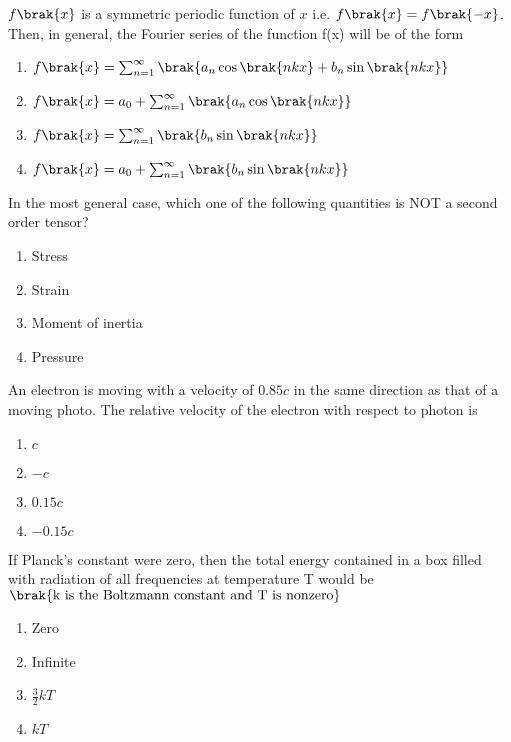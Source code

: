 \iffalse
\chapter{2013}
\author{EE24BTECH11003}
\section{ph}
\fi
\item $f\brak{x}$ is a symmetric periodic function of $x$ i.e. $f\brak{x} = f\brak{-x}$. Then, in general, the Fourier series of the function f(x) will be of the form
\hfill{}
\begin{enumerate}
\item $f\brak{x} = \sum_{n=1}^{\infty} \brak{a_n \cos\brak{nkx} + b_n\sin\brak{nkx}}$
\item $f\brak{x} = a_0 + \sum_{n=1}^{\infty} \brak{a_n \cos\brak{nkx}}$
\item $f\brak{x} = \sum_{n=1}^{\infty} \brak{b_n\sin\brak{nkx}}$
\item $f\brak{x} = a_0 + \sum_{n=1}^{\infty} \brak{b_n\sin\brak{nkx}}$
\end{enumerate}

\item In the most general case, which one of the following quantities is NOT a second order tensor?
\hfill{}
\begin{enumerate}
\item Stress
\item Strain
\item Moment of inertia
\item Pressure
\end{enumerate}

\item An electron is moving with a velocity of $0.85c$ in the same direction as that of a moving photo. The relative velocity of the electron with respect to photon is
\hfill{}
\begin{enumerate}
\item $c$
\item $-c$
\item $0.15c$
\item $-0.15c$
\end{enumerate}

\item If Planck's constant were zero, then the total energy contained in a box filled with radiation of all frequencies at temperature T would be $\brak{\text{k is the Boltzmann constant and T is nonzero}}$
\hfill{}
\begin{enumerate}
\item Zero
\item Infinite
\item $\frac{3}{2}kT$
\item $kT$
\end{enumerate}

